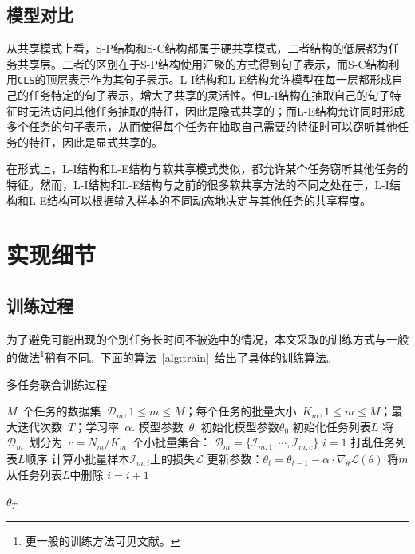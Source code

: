\subsection{模型对比}
从共享模式上看，S-P结构和S-C结构都属于硬共享模式，二者结构的低层都为任务共享层。二者的区别在于S-P结构使用汇聚的方式得到句子表示，而S-C结构利用\texttt{CLS}的顶层表示作为其句子表示。L-I结构和L-E结构允许模型在每一层都形成自己的任务特定的句子表示，增大了共享的灵活性。但L-I结构在抽取自己的句子特征时无法访问其他任务抽取的特征，因此是隐式共享的；而L-E结构允许同时形成多个任务的句子表示，从而使得每个任务在抽取自己需要的特征时可以窃听其他任务的特征，因此是显式共享的。

在形式上，L-I结构和L-E结构与软共享模式类似，都允许某个任务窃听其他任务的特征。然而，L-I结构和L-E结构与之前的很多软共享方法\cite{DBLP:conf/cvpr/MisraSGH16}\cite{1705.08142}的不同之处在于，L-I结构和L-E结构可以根据输入样本的不同动态地决定与其他任务的共享程度。

\section{实现细节}
\label{sec:imp}

\subsection{训练过程}
为了避免可能出现的个别任务长时间不被选中的情况，本文采取的训练方式与一般的做法\footnote{更一般的训练方法可见文献\cite{Caruana1997}。}稍有不同。下面的算法~\ref{alg:train}~给出了具体的训练算法。

\begin{algorithm}
	\caption{多任务联合训练过程}
	\label{alg:train}
	\begin{algorithmic}[1]
		\Require $M$~个任务的数据集~$\mathcal{D}_m, 1\le m \le M$；每个任务的批量大小~$K_m, 1\le m \le M$；最大迭代次数~$T$；学习率~$\alpha$.
		\Ensure 模型参数~$\theta$.
		\State 初始化模型参数$\theta_0$
		\State 初始化任务列表$L$
				\State 将~$\mathcal{D}_m$~划分为~$c=N_m/K_m$~个小批量集合：
				$\mathcal{B}_m = \{ \mathcal{I}_{m,1},\cdots, \mathcal{I}_{m,c} \}$
			\EndFor
			\State $i = 1$
			\State 打乱任务列表$L$顺序
			\State 计算小批量样本$\mathcal{I}_{m,i}$上的损失$\mathcal{L}$
			\State 更新参数：$\theta_t = \theta_{t-1}-\alpha \cdot \nabla_\theta \mathcal{L}(\theta) $
			\Else 
			\State 将$m$从任务列表$L$中删除
			\EndIf
			\EndFor
			\State $i = i + 1$
			\EndWhile

		\EndFor
		\State \Return $\theta_T$
		\EndFunction
	\end{algorithmic}
\end{algorithm}

